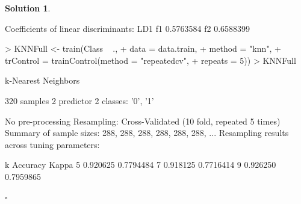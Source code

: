 \documentclass[twoside]{article}
\theoremstyle{definition}
\newtheorem*{solutionT}{Solution}
\newenvironment{solution}{\begin{cBox}\begin{solutionT}}{\hfill{\scriptsize\ensuremath{\square}}\end{solutionT}\end{cBox}}
\theoremstyle{definition}
\begin{document}
\begin{enumerate}
\begin{solution}
\begin{Schunk}
\begin{Soutput}
Coefficients of linear discriminants:
         LD1
f1 0.5763584
f2 0.6588399
\end{Soutput}
\end{Schunk}
\begin{Schunk}
\end{Schunk}
\begin{Schunk}
\begin{Sinput}
> KNNFull <- train(Class ~ .,
+                      data = data.train,
+                      method = "knn",
+                      trControl = trainControl(method = "repeatedcv", 
+                                               repeats = 5))
> KNNFull
\end{Sinput}
\begin{Soutput}
k-Nearest Neighbors 

320 samples
  2 predictor
  2 classes: '0', '1' 

No pre-processing
Resampling: Cross-Validated (10 fold, repeated 5 times) 
Summary of sample sizes: 288, 288, 288, 288, 288, 288, ... 
Resampling results across tuning parameters:

  k  Accuracy  Kappa    
  5  0.920625  0.7794484
  7  0.918125  0.7716414
  9  0.926250  0.7959865


\end{Soutput}
\end{Schunk}
\end{solution}
\end{enumerate}
\end{document}
